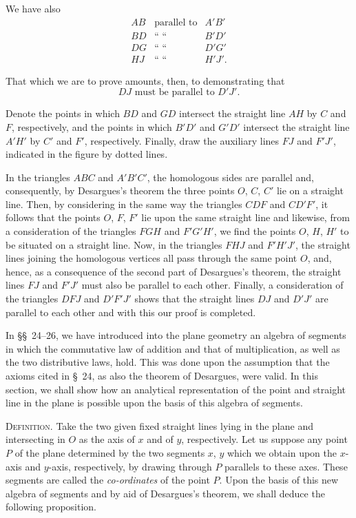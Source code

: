 \documentclass[11pt,oneside]{book}
\begin{document}
We have also
\begin{eqnarray*}
 AB & \mbox{parallel to} & A'B' \\
 BD & \mbox{`` ``} & B'D' \\
 DG & \mbox{`` ``} & D'G' \\
 HJ & \mbox{`` ``} & H'J'.
\end{eqnarray*}

\label{folio89}
That which we are to prove amounts, then, to demonstrating that
\[
DJ \mbox{ must be parallel to } D'J'.
\]

Denote the points in which $BD$ and $GD$ intersect
the straight line $AH$ by $C$ and $F$, respectively, and
the points in which $B'D'$ and $G'D'$ intersect the straight
line $A'H'$ by $C'$ and $F'$, respectively. Finally, draw
the auxiliary lines $FJ$ and $F'J'$, indicated in the figure
by dotted lines.

In the triangles $ABC$ and $A'B'C'$, the homologous
sides are parallel and, consequently, by Desargues's
theorem the three points $O$, $C$, $C'$ lie on a straight
line. Then, by considering in the same way the triangles
$CDF$ and $CD'F'$, it follows that the points
$O$, $F$, $F'$ lie upon the same straight line and likewise,
from a consideration of the triangles $FGH$ and
$F'G'H'$, we find the points $O$, $H$, $H'$ to be situated
on a straight line. Now, in the triangles $FHJ$ and
$F'H'J'$, the straight lines joining the homologous
vertices all pass through the same point $O$, and,
hence, as a consequence of the second part of Desargues's
theorem, the straight lines $FJ$ and $F'J'$ must
also be parallel to each other. Finally, a consideration
of the triangles $DFJ$ and $D'F'J'$ shows that the
straight lines $DJ$ and $D'J'$ are parallel to each other
and with this our proof is completed.

\label{p27}

In \S\S~24--26, we have introduced into the plane
geometry an algebra of segments in which the commutative
law of addition and that of multiplication,
as well as the two distributive laws, hold. This was
done upon the assumption that the axioms cited in
\S~24, as also the theorem of Desargues, were valid.
In this section, we shall show how an analytical representation
of the point and straight line in the plane
is possible upon the basis of this algebra of segments.

{\scshape Definition.} Take the two given fixed straight
lines lying in the plane and intersecting in $O$ as the
axis of $x$ and of $y$, respectively. Let us suppose any
point $P$ of the plane determined by the two segments
$x$, $y$ which we obtain upon the $x$-axis and $y$-axis, respectively,
by drawing through $P$ parallels to these
axes. These segments are called the \emph{co-ordinates} of
the point $P$. Upon the basis of this new algebra of
segments and by aid of Desargues's theorem, we shall
deduce the following proposition.
\end{document}
